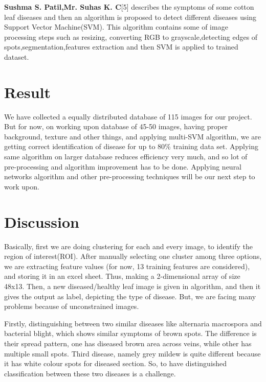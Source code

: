 \documentclass[conference]{IEEEtran}
\begin{document}
\textbf{Sushma S. Patil,Mr. Suhas K. C}[5] describes the symptoms of some cotton leaf diseases and then an algorithm is proposed to detect different diseases using Support Vector Machine(SVM). This algorithm contains some of image processing steps such as resizing, converting RGB to grayscale,detecting edges of spots,segmentation,features extraction and then SVM is applied to trained dataset.  


\bigskip
\bigskip

\section{Result}
 We have collected a equally distributed database of 115 images for our project. But for now, on working upon database of 45-50 images, having proper background, texture and other things, and applying multi-SVM algorithm, we are getting correct identification of disease for up to 80\% training data set. Applying same algorithm on larger database reduces efficiency very much, and so lot of pre-processing and algorithm improvement has to be done. Applying neural networks algorithm and other pre-processing techniques will be our next step to work upon.


\section{Discussion}

Basically, first we are doing clustering for each and every image, to identify the region of interest(ROI). After manually selecting one cluster among three options, we are extracting feature values (for now, 13 training features are considered), and storing it in an excel sheet. Thus, making a 2-dimensional array of size 48x13. Then, a new diseased/healthy leaf image is given in algorithm, and then it gives the output as label, depicting the type of disease. But, we are facing many problems because of unconstrained images. 

\vspace{3mm}

Firstly, distinguishing between two similar diseases like alternaria macrospora and bacterial blight, which shows similar symptoms of brown spots. The difference is their spread pattern, one has diseased brown area across veins, while other has multiple small spots. Third disease, namely grey mildew is quite different because it has white colour spots for diseased section. So, to have distinguished classification between these two diseases is a challenge.
\end{document}
